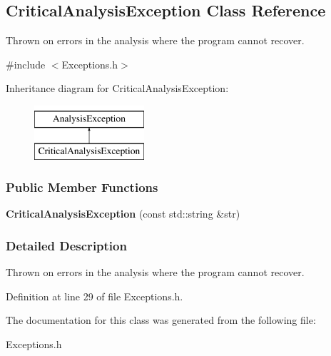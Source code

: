 \hypertarget{classCriticalAnalysisException}{
\subsection{CriticalAnalysisException Class Reference}
\label{classCriticalAnalysisException}
}


Thrown on errors in the analysis where the program cannot recover.  




{\ttfamily \#include $<$Exceptions.h$>$}

Inheritance diagram for CriticalAnalysisException:\begin{figure}[H]
\begin{center}
\leavevmode
\includegraphics[height=2.000000cm]{classCriticalAnalysisException}
\end{center}
\end{figure}
\subsubsection*{Public Member Functions}
\begin{DoxyCompactItemize}
\item 
\hypertarget{classCriticalAnalysisException_a6d8c2626ca573a0cc7e70da8edb4c602}{
{\bfseries CriticalAnalysisException} (const std::string \&str)}
\label{classCriticalAnalysisException_a6d8c2626ca573a0cc7e70da8edb4c602}

\end{DoxyCompactItemize}


\subsubsection{Detailed Description}
Thrown on errors in the analysis where the program cannot recover. 

Definition at line 29 of file Exceptions.h.



The documentation for this class was generated from the following file:\begin{DoxyCompactItemize}
\item 
Exceptions.h\end{DoxyCompactItemize}

